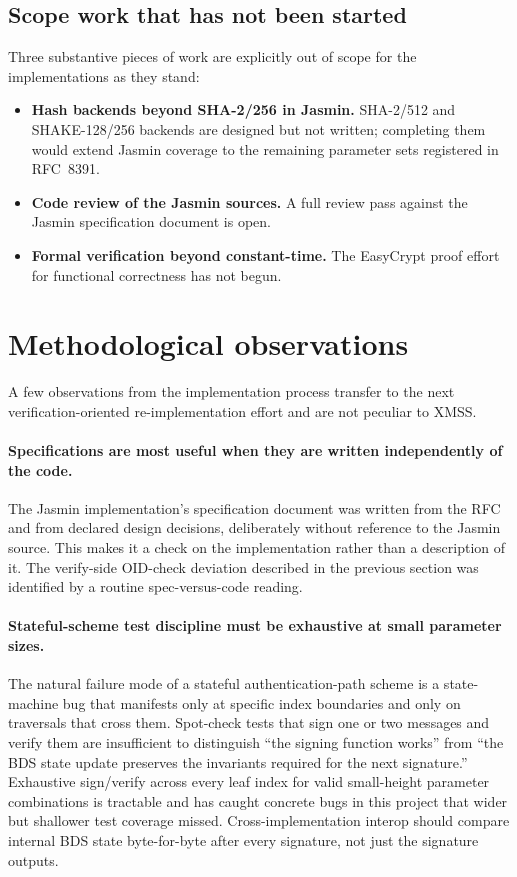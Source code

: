 \documentclass[11pt,a4paper]{article}
\begin{document}
\subsection{Scope work that has not been started}

Three substantive pieces of work are explicitly out of scope for
the implementations as they stand:

\begin{itemize}[nosep]
  \item \textbf{Hash backends beyond SHA-2/256 in Jasmin.} SHA-2/512
    and SHAKE-128/256 backends are designed but not written;
    completing them would extend Jasmin coverage to the remaining
    parameter sets registered in RFC~8391.
  \item \textbf{Code review of the Jasmin sources.} A full review
    pass against the Jasmin specification document is open.
  \item \textbf{Formal verification beyond constant-time.} The
    EasyCrypt proof effort for functional correctness has not begun.
\end{itemize}

\section{Methodological observations}

A few observations from the implementation process transfer to the
next verification-oriented re-implementation effort and are not
peculiar to XMSS.

\paragraph{Specifications are most useful when they are written
independently of the code.}
The Jasmin implementation's specification document was written from
the RFC and from declared design decisions, deliberately without
reference to the Jasmin source. This makes it a check on the
implementation rather than a description of it. The verify-side
OID-check deviation described in the previous section was identified
by a routine spec-versus-code reading.

\paragraph{Stateful-scheme test discipline must be exhaustive at
small parameter sizes.}
The natural failure mode of a stateful authentication-path scheme
is a state-machine bug that manifests only at specific index
boundaries and only on traversals that cross them. Spot-check tests
that sign one or two messages and verify them are insufficient to
distinguish ``the signing function works'' from ``the BDS state
update preserves the invariants required for the next signature.''
Exhaustive sign/verify across every leaf index for valid
small-height parameter combinations is tractable and has caught
concrete bugs in this project that wider but shallower test
coverage missed. Cross-implementation interop should compare
internal BDS state byte-for-byte after every signature, not just
the signature outputs.
\end{document}
